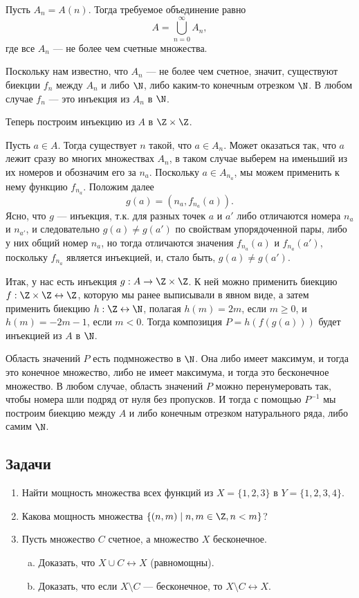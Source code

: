 \begin{enumerate}
Пусть $A_n = A(n)$. Тогда требуемое объединение равно
$$
A = \bigcup_{n=0}^\infty A_n,
$$
где все $A_n$ --- не более чем счетные множества.

Поскольку нам известно, что $A_n$ --- не более чем счетное, значит, существуют биекции $f_n$ между $A_n$ и либо $\N$, либо каким-то конечным отрезком $\N$. В любом случае $f_n$ --- это инъекция из $A_n$ в $\N$.

Теперь построим инъекцию из $A$ в $\Z\times\Z$.

Пусть $a\in A$. Тогда существует $n$ такой, что $a\in A_n$. Может оказаться так, что $a$ лежит сразу во многих множествах $A_n$, в таком случае выберем на    именьший из их номеров и обозначим его за $n_a$. Поскольку $a\in A_{n_a}$, мы можем применить к нему функцию $f_{n_a}$. Положим далее
$$
g(a) = (n_a,f_{n_a}(a)).
$$
Ясно, что $g$ --- инъекция, т.к. для разных точек $a$ и $a'$ либо отличаются номера $n_a$ и $n_{a'}$, и следовательно $g(a)\ne g(a')$ по свойствам упорядоченной пары, либо у них общий номер $n_a$, но тогда отличаются значения $f_{n_a}(a)$ и $f_{n_a}(a')$, поскольку $f_{n_a}$ является инъекцией, и, стало быть, $g(a)\ne g(a')$.

Итак, у нас есть инъекция $g:A\to\Z\times\Z$. К ней можно применить биекцию $f:\Z\times\Z\leftrightarrow\Z$, которую мы ранее выписывали в явном виде, а затем применить биекцию $h:\Z\leftrightarrow\N$, полагая $h(m)=2m$, если $m\ge 0$, и $h(m)=-2m-1$, если $m<0$. Тогда композиция $P=h(f(g(a)))$ будет инъекцией из $A$ в $\N$.

Область значений $P$ есть подмножество в $\N$. Она либо имеет максимум, и тогда это конечное множество, либо не имеет максимума, и тогда это бесконечное множество. В любом случае, область значений $P$ можно перенумеровать так, чтобы номера шли подряд от нуля без пропусков. И тогда с помощью $P^{-1}$ мы построим биекцию между $A$ и либо конечным отрезком натурального ряда, либо самим $\N$.\epf

\end{enumerate}


\subsection*{Задачи}

\begin{enumerate}
\item Найти мощность множества всех функций из $X=\{1,2,3\}$ в $Y=\{1,2,3,4\}$.
\item Какова мощность множества $\{(n,m)\mid n,m\in\Z, n<m\}$?
\item Пусть множество $C$ счетное, а множество $X$ бесконечное.
\begin{enumerate}[a)]
\item Доказать, что $X\cup C\leftrightarrow X$ (равномощны).
\item Доказать, что если $X\setminus C$ --- бесконечное, то $X\setminus C\leftrightarrow X$.
\end{enumerate}
\end{enumerate}

